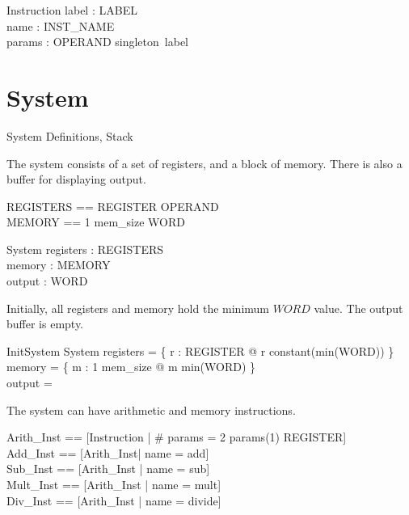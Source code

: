 \documentclass{article}
\begin{document}
\begin{schema}{Instruction}
  label : \power LABEL \\
  name : INST\_NAME \\
  params : \seq OPERAND
\where
  singleton~label
\end{schema}

\ZDeclSummary

\section{System}

\begin{zsection}
  \SECTION System \parents Definitions, Stack
\end{zsection}

The system consists of a set of registers, and a block of
memory. There is also a buffer for displaying output.

\begin{zed}
  REGISTERS == REGISTER \fun OPERAND\\
  MEMORY == 1 \upto mem\_size \pfun WORD
\end{zed}

\begin{schema}{System}
  registers : REGISTERS\\
  memory : MEMORY\\
  output : \seq WORD
\end{schema}

Initially, all registers and memory hold the minimum $WORD$ value. The
output buffer is empty.

\begin{schema}{InitSystem}
  System
\where
  registers = \{ r : REGISTER @ r \mapsto constant(min(WORD)) \}\\
  memory = \{ m : 1 \upto mem\_size @ m \mapsto min(WORD) \}\\
  output = \langle \rangle
\end{schema}

The system can have arithmetic and memory instructions.

\begin{zed}
  Arith\_Inst == [Instruction | \# params = 2 \land params(1) \in REGISTER]\\
  Add\_Inst == [Arith\_Inst| name = add]\\
  Sub\_Inst == [Arith\_Inst | name = sub]\\
  Mult\_Inst == [Arith\_Inst | name = mult]\\
  Div\_Inst == [Arith\_Inst | name = divide]
\end{zed}
\end{document}
